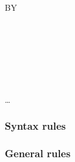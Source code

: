 \begin{syntax}[\miscextcolour]
  \begin{0-1}
  \end{0-1}
  \literal

  \begin{0-1}
  \end{0-1}

  \begin{0-1}

    \begin{1=}
      \begin{0-1}
        BY
        \begin{1=}
           \\
           \\
        \end{1=}
      \end{0-1}

      \begin{1=}
         \\

        \begin{1=}
          \begin{1=}
            \identifier \\
            \literal
          \end{1=}
        \end{1=}
      \end{1=}\ldots
    \end{1=}
  \end{0-1}
\end{syntax}

\begin{syntax}[\gnucobolcolour]
      \literal
\end{syntax}

\subsubsection{Syntax rules}

\subsubsection{General rules}

